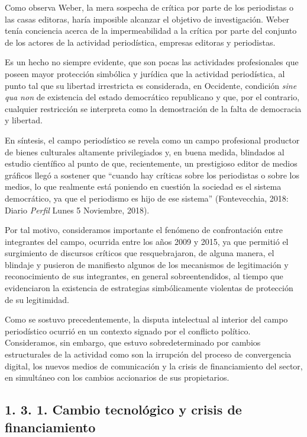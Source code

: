 Como observa Weber, la mera sospecha de crítica por parte de los periodistas o las casas editoras, haría imposible alcanzar el objetivo de investigación. Weber tenía conciencia acerca de la impermeabilidad a la crítica por parte del conjunto de los actores de la actividad periodística, empresas editoras y periodistas.

Es un hecho no siempre evidente, que son pocas las actividades profesionales que poseen mayor protección simbólica y jurídica que la actividad periodística, al punto tal que su libertad irrestricta es considerada, en Occidente, condición \emph{sine qua non} de existencia del estado democrático republicano y que, por el contrario, cualquier restricción se interpreta como la demostración de la falta de democracia y libertad.

En síntesis, el campo periodístico se revela como un campo profesional productor de bienes culturales altamente privilegiados y, en buena medida, blindados al estudio científico al punto de que, recientemente, un prestigioso editor de medios gráficos llegó a sostener que ``cuando hay críticas sobre los periodistas o sobre los medios, lo que realmente está poniendo en cuestión la sociedad es el sistema democrático, ya que el periodismo es hijo de ese sistema'' (Fontevecchia, 2018: Diario \emph{Perfil} Lunes 5 Noviembre, 2018).

Por tal motivo, consideramos importante el fenómeno de confrontación entre integrantes del campo, ocurrida entre los años 2009 y 2015, ya que permitió el surgimiento de discursos críticos que resquebrajaron, de alguna manera, el blindaje y pusieron de manifiesto algunos de los mecanismos de legitimación y reconocimiento de sus integrantes, en general sobreentendidos, al tiempo que evidenciaron la existencia de estrategias simbólicamente violentas de protección de su legitimidad.

Como se sostuvo precedentemente, la disputa intelectual al interior del campo periodístico ocurrió en un contexto signado por el conflicto político. Consideramos, sin embargo, que estuvo sobredeterminado por cambios estructurales de la actividad como son la irrupción del proceso de convergencia digital, los nuevos medios de comunicación y la crisis de financiamiento del sector, en simultáneo con los cambios accionarios de sus propietarios.


\subsection{1. 3. 1. Cambio tecnológico y crisis de financiamiento}


